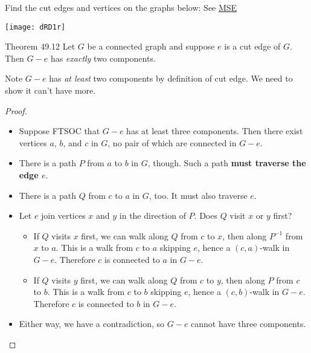 \documentclass
[ignorenonframetext,aspectratio=169]
{ngelessonslides}
\begin{document}
\begin{example}
Find the cut edges and vertices on the graphs below:
See \href{https://math.stackexchange.com/q/457159/2785}{MSE}
\begin{center}
\texttt{[image: dRD1r]}
\end{center}
\end{example}

\begin{frame}[label=cut-thm]
    \begin{block}{Theorem 49.12}
   Let $G$ be a connected graph and suppose $e$ is a cut edge of $G$.
   Then $G-e$ has \emph{exactly} two components.
   \end{block}
   Note $G-e$ has \emph{at least} two components by definition of cut edge.
   We need to show it can't have more.
\end{frame}

\begin{frame}[label=cut-proof]
\begin{proof}
\begin{overlayarea}{\textwidth}{0.8\textheight}
\begin{itemize}
\item<only@1-4|uncover@+-> Suppose FTSOC that $G-e$ has at least three components.  Then there exist vertices $a$, $b$, and $c$ in $G$,
no pair of which are connected in $G-e$.
\item<only@1-4|uncover@+-> There is a path $P$ from $a$ to $b$ in $G$, though.  Such a path \textbf{must traverse the edge $e$}.
\item<only@1-4|uncover@+-> There is a path $Q$ from $c$ to $a$ in $G$, too.  It must also traverse $e$.
\item<uncover@+-> Let $e$ join vertices $x$ and $y$ in the direction of $P$.  Does $Q$ visit $x$ or $y$ first?
\begin{itemize}
\item<uncover@+-> If $Q$ visits $x$ first, we can walk along $Q$ from $c$ to $x$, then along $P^{-1}$ from $x$ to $a$.
    This is a walk from $c$ to $a$ skipping $e$, hence a $(c,a)$-walk in $G-e$.  Therefore $c$ is connected to $a$ in $G-e$.
    \raa
\item<uncover@+-> If $Q$ visits $y$ first, we can walk along $Q$ from $c$ to $y$, then along $P$ from $c$ to $b$.
    This is a walk from $c$ to $b$ skipping $e$, hence a $(c,b)$-walk in $G-e$.  Therefore $c$ is connected to $b$ in $G-e$.
    \raa
\end{itemize}
\item<uncover@+-> Either way, we have a contradiction, so $G-e$ cannot have three components.\qedhere
\end{itemize}

\end{overlayarea}\end{proof}
\end{frame}
\end{document}
